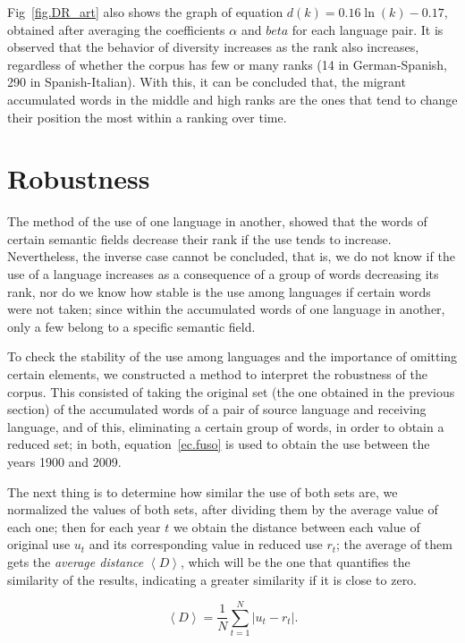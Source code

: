 \documentclass[10pt,letterpaper]{article} %
\begin{document}
Fig~\ref{fig.DR_art} also shows the graph of equation $d(k) = 0.16\ln(k) - 0.17$, obtained after averaging the coefficients $\alpha$ and $beta$ for each language pair. It is observed that the behavior of diversity increases as the rank also increases, regardless of whether the corpus has few or many ranks (14 in German-Spanish, 290 in Spanish-Italian). With this, it can be concluded that, the migrant accumulated words in the middle and high ranks are the ones that tend to change their position the most within a ranking over time.



\section*{Robustness} %

The method of the use of one language in another, showed that the words of certain semantic fields decrease their rank if the use tends to increase. Nevertheless, the inverse case cannot be concluded, that is, we do not know if the use of a language increases as a consequence of a group of words decreasing its rank, nor do we know how stable is the use among languages if certain words were not taken; since within the accumulated words of one language in another, only a few belong to a specific semantic field.

To check the stability of the use among languages and the importance of omitting certain elements, we constructed a method to interpret the robustness of the corpus. This consisted of taking the original set (the one obtained in the previous section) of the accumulated words of a pair of source language and receiving language, and of this, eliminating a certain group of words, in order to obtain a reduced set; in both,  equation~\ref{ec.fuso} is used to obtain the use between the years 1900 and 2009.

The next thing is to determine how similar the use of both sets are, we normalized the values of both sets, after dividing them by the average value of each one; then for each year $t$ we obtain the distance between each value of original use $u_{t}$ and its corresponding value in reduced use $r_{t}$; the average of them gets the \textit{average distance} $\left\langle D \right\rangle$, which will be the one that quantifies the similarity of the results, indicating a greater similarity if it is close to zero.

\begin{equation}
\left\langle D \right\rangle  = \frac{1}{N}\sum_{t=1}^{N} \left| u_{t} - r_{t} \right|  .
\label{ec.Davg}
\end{equation}
\end{document}
